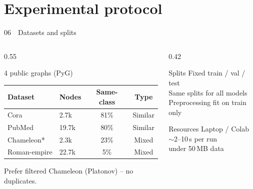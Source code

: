 \documentclass[
  english,
  aspectratio=169,
]{beamer}
\begin{document}
\section{Experimental protocol}

\begin{frame}{06~~Datasets and splits}
  \begin{columns}[T]
    \begin{column}{0.55\textwidth}
      \begin{block}{4 public graphs (PyG)}
        \scriptsize
        \renewcommand{\arraystretch}{1.15}
        \begin{tabular}{llcc}
          Dataset & Nodes & Same-class & Type \\
          \hline
          Cora & 2.7k & 81\% & Similar \\
          PubMed & 19.7k & 80\% & Similar \\
          Chameleon* & 2.3k & 23\% & Mixed \\
          Roman-empire & 22.7k & 5\% & Mixed \\
        \end{tabular}
        \vspace{0.35em}

        {\scriptsize * Prefer filtered Chameleon (Platonov) -- no duplicates.}
      \end{block}
    \end{column}
    \begin{column}{0.42\textwidth}
      \begin{block}{Splits}
        Fixed train / val / test \\
        Same splits for all models \\
        Preprocessing fit on train only
      \end{block}
      \begin{block}{Resources}
        Laptop / Colab \\
        $\sim$2--10\,s per run \\
        under 50\,MB data
      \end{block}
    \end{column}
  \end{columns}
\end{frame}
\end{document}
